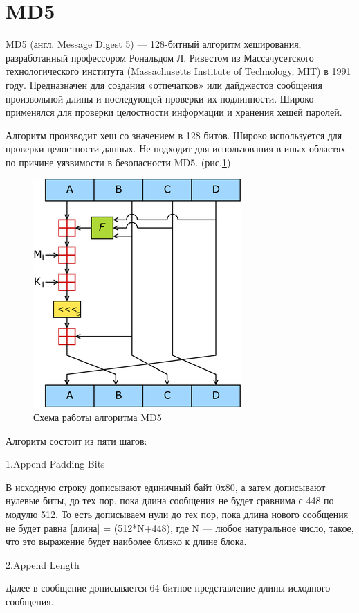 \documentclass[a4paper, 12pt, oneside]{scrartcl}
\begin{document}
	\section{MD5}\label{sec:section2}
	MD5 (англ. Message Digest 5) — 128-битный алгоритм хеширования, разработанный профессором Рональдом Л. Ривестом из Массачусетского технологического института (Massachusetts Institute of Technology, MIT) в 1991 году.
	Предназначен для создания «отпечатков» или дайджестов сообщения произвольной длины и последующей проверки их подлинности.
	Широко применялся для проверки целостности информации и хранения хешей паролей.
	
	Алгоритм производит хеш со значением в 128 битов. Широко используется для проверки целостности данных.
	Не подходит для использования в иных областях по причине уязвимости в безопасности MD5. (рис.\ref{fig:key1})
	\begin{figure}[h!]
		\centering
		\includegraphics[scale=0.9]{MD5}
		\caption{Схема работы алгоритма MD5}
		\label{fig:key1}
	\end{figure}
	\par
	Алгоритм состоит из пяти шагов:\par
	1.Append Padding Bits\par
	В исходную строку дописывают единичный байт 0х80, а затем дописывают нулевые биты, до тех пор, пока длина сообщения не будет сравнима с 448 по модулю 512.
	То есть дописываем нули до тех пор, пока длина нового сообщения не будет равна [длина] = (512*N+448), где N — любое натуральное число, такое, что это выражение будет наиболее близко к длине блока.
	
	2.Append Length\par
	Далее в сообщение дописывается 64-битное представление длины исходного сообщения.
	
\end{document}
